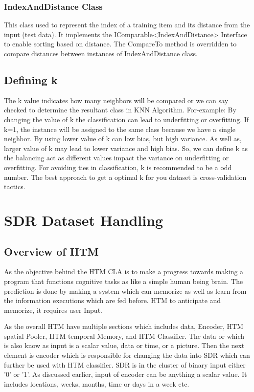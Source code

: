 \documentclass[conference]{IEEEtran}
\begin{document}
\subsubsection{IndexAndDistance Class}
This class used to represent the index of a training item and its distance from the input (test data). It implements the IComparable<IndexAndDistance> Interface to enable sorting based on distance. The CompareTo method is overridden to compare distances between instances of IndexAndDistance class.





\subsection{Defining k}
The k value indicates how many neighbors will be compared or we can say checked to determine the resultant class in KNN Algorithm. For-example: By changing the value of k the classification can lead to underfitting or overfitting. If k=1, the instance will be assigned to the same class because we have a single neighbor. By using lower value of k can low bias, but high variance. As well as, larger value of k may lead to lower variance and high bias. So, we can define k as the balancing act as different values impact the variance on underfitting or overfitting. 
For avoiding ties in classification, k is recommended to be a odd number. The best approach to get a optimal k for you dataset is cross-validation tactics.  


\section{SDR Dataset Handling}


\subsection{Overview of HTM}
As the objective behind the HTM CLA is to make a progress towards making a program that functions cognitive tasks as like a simple human being brain. The prediction is done by making a system which can memorize as well as learn from the information executions which are fed before. HTM to anticipate and memorize, it requires user Input. 

As the overall HTM have multiple sections which includes data, Encoder, HTM spatial Pooler, HTM temporal Memory, and HTM Classifier. The data or which is also know as input is a scalar value, data or time, or a picture. Then the next element is encoder which is responsible for changing the data into SDR which can further be used with HTM classifier. SDR is in the cluster of binary input either '0' or '1'. As discussed earlier, input of encoder can be anything a scalar value. It includes locations, weeks, months, time or days in a week etc. 
\end{document}
